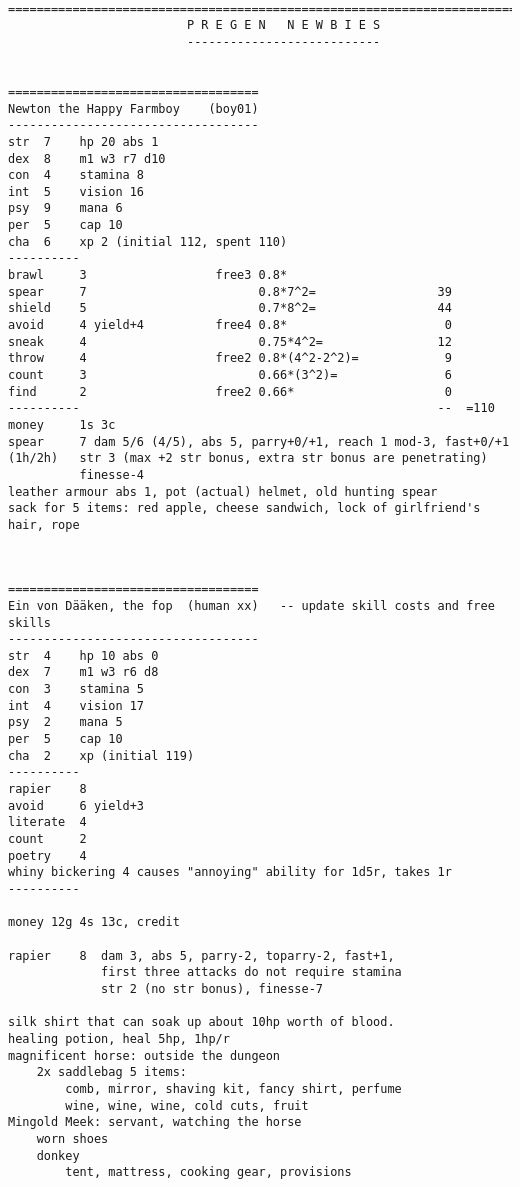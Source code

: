 \

\goodbreak
\tiny \begin{samepage} \begin{verbatim}
================================================================================
                         P R E G E N   N E W B I E S
                         ---------------------------


===================================
Newton the Happy Farmboy    (boy01)
-----------------------------------
str  7    hp 20 abs 1
dex  8    m1 w3 r7 d10
con  4    stamina 8
int  5    vision 16
psy  9    mana 6
per  5    cap 10
cha  6    xp 2 (initial 112, spent 110)
----------
brawl     3                  free3 0.8*
spear     7                        0.8*7^2=                 39
shield    5                        0.7*8^2=                 44
avoid     4 yield+4          free4 0.8*                      0
sneak     4                        0.75*4^2=                12
throw     4                  free2 0.8*(4^2-2^2)=            9
count     3                        0.66*(3^2)=               6
find      2                  free2 0.66*                     0
----------                                                  --  =110
money     1s 3c
spear     7 dam 5/6 (4/5), abs 5, parry+0/+1, reach 1 mod-3, fast+0/+1
(1h/2h)   str 3 (max +2 str bonus, extra str bonus are penetrating)
          finesse-4
leather armour abs 1, pot (actual) helmet, old hunting spear
sack for 5 items: red apple, cheese sandwich, lock of girlfriend's hair, rope
\end{verbatim} \end{samepage} \normalsize


\



\goodbreak
\tiny \begin{samepage} \begin{verbatim}
===================================
Ein von Dääken, the fop  (human xx)   -- update skill costs and free skills
-----------------------------------
str  4    hp 10 abs 0
dex  7    m1 w3 r6 d8
con  3    stamina 5
int  4    vision 17
psy  2    mana 5
per  5    cap 10
cha  2    xp (initial 119)
----------
rapier    8
avoid     6 yield+3
literate  4
count     2
poetry    4
whiny bickering 4 causes "annoying" ability for 1d5r, takes 1r
----------

money 12g 4s 13c, credit

rapier    8  dam 3, abs 5, parry-2, toparry-2, fast+1,
             first three attacks do not require stamina
             str 2 (no str bonus), finesse-7

silk shirt that can soak up about 10hp worth of blood.
healing potion, heal 5hp, 1hp/r
magnificent horse: outside the dungeon
    2x saddlebag 5 items:
        comb, mirror, shaving kit, fancy shirt, perfume
        wine, wine, wine, cold cuts, fruit
Mingold Meek: servant, watching the horse
    worn shoes
    donkey
        tent, mattress, cooking gear, provisions
\end{verbatim} \end{samepage} \normalsize


